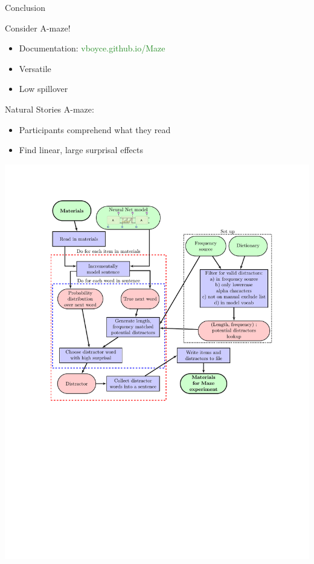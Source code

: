 \documentclass[12pt, xcolor=beamer,table,usenames,dvipsnames, ignorenonframetext, ngerman,t]{beamer}
\begin{document}
\begin{frame}{Conclusion}
	
	\pause
	
Consider A-maze! 
\begin{itemize}\pause
	\item Documentation:  \textcolor{ForestGreen}{vboyce.github.io/Maze} \pause
	\item Versatile \pause
	\item Low spillover \pause 
\end{itemize}

Natural Stories A-maze: \pause 
\begin{itemize}
	\item Participants comprehend what they read \pause
	\item Find linear, large surprisal effects
\end{itemize}

\end{frame}

\appendix

\begin{frame}
	\centering
	\includegraphics[clip, trim=3.25cm 5cm 2.5cm 2.5cm,width=.9\textwidth]{../flow_2.pdf}
\end{frame}
\end{document}
